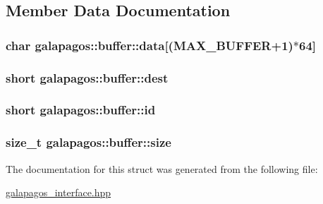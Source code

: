 \subsection{Member Data Documentation}
\subsubsection[{\texorpdfstring{data}{data}}]{\setlength{\rightskip}{0pt plus 5cm}char galapagos\+::buffer\+::data\mbox{[}({\bf M\+A\+X\+\_\+\+B\+U\+F\+F\+ER}+1)$\ast$64\mbox{]}}\hypertarget{structgalapagos_1_1buffer_acfd1efa3acf7e85361a853e6ca117b04}{}\label{structgalapagos_1_1buffer_acfd1efa3acf7e85361a853e6ca117b04}
\subsubsection[{\texorpdfstring{dest}{dest}}]{\setlength{\rightskip}{0pt plus 5cm}short galapagos\+::buffer\+::dest}\hypertarget{structgalapagos_1_1buffer_a28db83ccda617a0d33df0d0550c34245}{}\label{structgalapagos_1_1buffer_a28db83ccda617a0d33df0d0550c34245}
\subsubsection[{\texorpdfstring{id}{id}}]{\setlength{\rightskip}{0pt plus 5cm}short galapagos\+::buffer\+::id}\hypertarget{structgalapagos_1_1buffer_a21f882f0266b60265be7051bc608b387}{}\label{structgalapagos_1_1buffer_a21f882f0266b60265be7051bc608b387}
\subsubsection[{\texorpdfstring{size}{size}}]{\setlength{\rightskip}{0pt plus 5cm}size\+\_\+t galapagos\+::buffer\+::size}\hypertarget{structgalapagos_1_1buffer_aead0014d1e1d46ec97d21896fb05f483}{}\label{structgalapagos_1_1buffer_aead0014d1e1d46ec97d21896fb05f483}


The documentation for this struct was generated from the following file\+:\begin{DoxyCompactItemize}
\item 
\hyperlink{galapagos__interface_8hpp}{galapagos\+\_\+interface.\+hpp}\end{DoxyCompactItemize}
